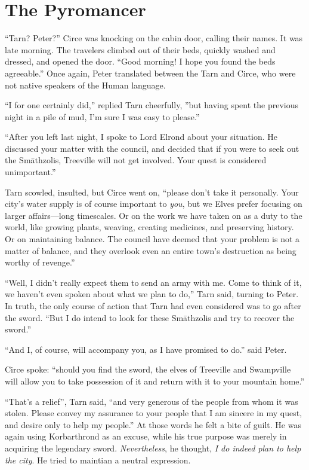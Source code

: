 \chapter{The Pyromancer}

``Tarn?  Peter?''  Circe was knocking on the cabin door, calling their names.  It was late morning.  The travelers climbed out of their beds, quickly washed and dressed, and opened the door.  ``Good morning!  I hope you found the beds agreeable.''  Once again, Peter translated between the Tarn and Circe, who were not native speakers of the Human language.

``I for one certainly did,'' replied Tarn cheerfully, ''but having spent the previous night in a pile of mud, I'm sure I was easy to please.''

``After you left last night, I spoke to Lord Elrond about your situation.  He discussed your matter with the council, and decided that if you were to seek out the Sm\=athzolis, Treeville will not get involved.  Your quest is considered unimportant.''

Tarn scowled, insulted, but Circe went on, ``please don't take it personally.  Your city's water supply is of course important to \emph{you}, but we Elves prefer focusing on larger affairs---long timescales.  Or on the work we have taken on as a duty to the world, like growing plants, weaving, creating medicines, and preserving history.  Or on maintaining balance.  The council have deemed that your problem is not a matter of balance, and they overlook even an entire town's destruction as being worthy of revenge.''

``Well, I didn't really expect them to send an army with me.  Come to think of it, we haven't even spoken about what we plan to do,'' Tarn said, turning to Peter.  In truth, the only course of action that Tarn had even considered was to go after the sword.  ``But I do intend to look for these Sm\=athzolis and try to recover the sword.''

``And I, of course, will accompany you, as I have promised to do.'' said Peter.

Circe spoke: ``should you find the sword, the elves of Treeville and Swampville will allow you to take possession of it and return with it to your mountain home.''

``That's a relief'', Tarn said, ``and very generous of the people from whom it was stolen.  Please convey my assurance to your people that I am sincere in my quest, and desire only to help my people.''  At those words he felt a bite of guilt.  He was again using Korbarthrond as an excuse, while his true purpose was merely in acquiring the legendary sword.  \emph{Nevertheless}, he thought, \emph{I do indeed plan to help the city}.  He tried to maintian a neutral expression.


